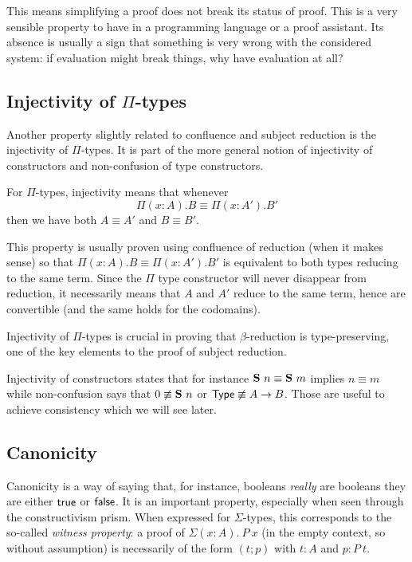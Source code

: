 This means simplifying a proof does not break its status of proof. This is a
very sensible property to have in a programming language or a proof assistant.
Its absence is usually a sign that something is very wrong with the considered
system: if evaluation might break things, why have evaluation at all?

\subsection{Injectivity of \(\Pi\)-types}

Another property slightly related to confluence and subject reduction is
the injectivity of \(\Pi\)-types. It is part of the more general notion of
injectivity of constructors and non-confusion of type constructors.

For \(\Pi\)-types, injectivity means that whenever
\[
  \Pi (x:A).B \equiv \Pi (x:A').B'
\]
then we have both \(A \equiv A'\) and \(B \equiv B'\).

This property is usually proven using confluence of reduction (when it makes
sense) so that \(\Pi (x:A).B \equiv \Pi (x:A').B'\) is equivalent to both types
reducing to the same term. Since the \(\Pi\) type constructor will never
disappear from reduction, it necessarily means that \(A\) and \(A'\) reduce to
the same term, hence are convertible (and the same holds for the codomains).

Injectivity of \(\Pi\)-types is crucial in proving that \(\beta\)-reduction is
type-preserving, one of the key elements to the proof of subject reduction.

Injectivity of constructors states that for instance
\(\mathbf{S}\ n \equiv \mathbf{S}\ m\) implies \(n \equiv m\) while non-confusion
says that \(0 \not\equiv \mathbf{S}\ n\) or \(\mathsf{Type} \not\equiv A \to B\).
Those are useful to achieve consistency which we will see later.

\subsection{Canonicity}

Canonicity is a way of saying that, for instance, booleans \emph{really} are
booleans \ie they are either \(\mathsf{true}\) or \(\mathsf{false}\).
It is an important property, especially when seen through the constructivism
prism.
When expressed for \(\Sigma\)-types, this corresponds to the so-called
\emph{witness property}: a proof of \(\Sigma (x:A).\ P\ x\) (in the empty
context, so without assumption) is necessarily of the form \((t;p)\)
with \(t : A\) and \(p : P\ t\).

